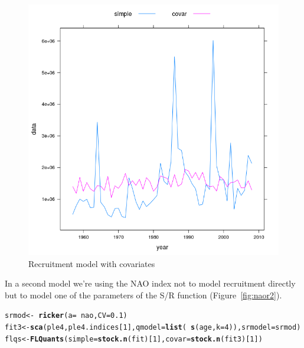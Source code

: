 \documentclass[a4paper,english,10pt]{article}\usepackage[]{graphicx}\usepackage[]{color}
\makeatletter
\def\maxwidth{ %
  \ifdim\Gin@nat@width>\linewidth
    \linewidth
  \else
    \Gin@nat@width
  \fi
}
\newcommand{\hlnum}[1]{\textcolor[rgb]{0.686,0.059,0.569}{#1}}%
\newcommand{\hlopt}[1]{\textcolor[rgb]{0,0,0}{#1}}%
\newcommand{\hlstd}[1]{\textcolor[rgb]{0.345,0.345,0.345}{#1}}%
\newcommand{\hlkwb}[1]{\textcolor[rgb]{0.69,0.353,0.396}{#1}}%
\newcommand{\hlkwc}[1]{\textcolor[rgb]{0.333,0.667,0.333}{#1}}%
\newcommand{\hlkwd}[1]{\textcolor[rgb]{0.737,0.353,0.396}{\textbf{#1}}}%
\newenvironment{kframe}{%
 \def\at@end@of@kframe{}%
 \ifinner\ifhmode%
  \def\at@end@of@kframe{\end{minipage}}%
  \begin{minipage}{\columnwidth}%
 \fi\fi%
 \def\FrameCommand##1{\hskip\@totalleftmargin \hskip-\fboxsep
 \colorbox{shadecolor}{##1}\hskip-\fboxsep
     \hskip-\linewidth \hskip-\@totalleftmargin \hskip\columnwidth}%
 \MakeFramed {\advance\hsize-\width
   \@totalleftmargin\z@ \linewidth\hsize
   \@setminipage}}%
 {\par\unskip\endMakeFramed%
 \at@end@of@kframe}
\newenvironment{knitrout}{}{} %
\makeatother
\begin{document}
\begin{knitrout}
\color{fgcolor}\begin{figure}[H]

{\centering \includegraphics[width=\maxwidth]{figure/naor-1} 

}

\caption[Recruitment model with covariates]{Recruitment model with covariates}\label{fig:naor}
\end{figure}


\end{knitrout}

In a second model we're using the NAO index not to model recruitment directly but to model one of the parameters of the S/R function (Figure~\ref{fig:naor2}). 

\begin{knitrout}
\color{fgcolor}\begin{kframe}
\begin{alltt}
\hlstd{srmod} \hlkwb{<-} \hlopt{~}\hlkwd{ricker}\hlstd{(}\hlkwc{a} \hlstd{=} \hlopt{~}\hlstd{nao,} \hlkwc{CV} \hlstd{=} \hlnum{0.1}\hlstd{)}
\hlstd{fit3} \hlkwb{<-} \hlkwd{sca}\hlstd{(ple4, ple4.indices[}\hlnum{1}\hlstd{],} \hlkwc{qmodel} \hlstd{=} \hlkwd{list}\hlstd{(}\hlopt{~}\hlkwd{s}\hlstd{(age,} \hlkwc{k} \hlstd{=} \hlnum{4}\hlstd{)),} \hlkwc{srmodel} \hlstd{= srmod)}
\hlstd{flqs} \hlkwb{<-} \hlkwd{FLQuants}\hlstd{(}\hlkwc{simple} \hlstd{=} \hlkwd{stock.n}\hlstd{(fit)[}\hlnum{1}\hlstd{],} \hlkwc{covar} \hlstd{=} \hlkwd{stock.n}\hlstd{(fit3)[}\hlnum{1}\hlstd{])}
\end{alltt}
\end{kframe}
\end{knitrout}
\end{document}
